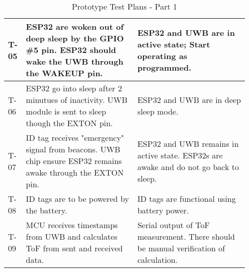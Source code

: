 \begin{table}[h!]
\begin{tabular}{|m{0.05\linewidth}|m{0.45\linewidth}|m{0.45\linewidth}|}
    T-05
    & ESP32 are woken out of deep sleep by the GPIO \#5 pin. ESP32 should wake the UWB through the WAKEUP pin.
    & ESP32 and UWB are in active state; Start operating as programmed. \\ 
    \hline

    T-06
    & ESP32 go into sleep after 2 minutues of inactivity. UWB module is sent to sleep though the EXTON pin.
    & ESP32 and UWB are in deep sleep mode. \\ 
    \hline

    T-07
    & ID tag receives "emergency" signal from beacons. UWB chip ensure ESP32 remains awake through the EXTON pin.
    & ESP32 and UWB remains in active state. ESP32s are awake and do not go back to sleep. \\ 
    \hline

    T-08
    & ID tags are to be powered by the battery.
    & ID tags are functional using battery power. \\ 
    \hline   
    
    T-09
    & MCU receives timestamps from UWB and calculates ToF from sent and received data.
    & Serial output of ToF measurement. There should be manual verification of calculation.   \\ 
    \hline
    
\end{tabular}
    \caption{Prototype Test Plans - Part 1}
\end{table}    
    
\pagebreak    
    
